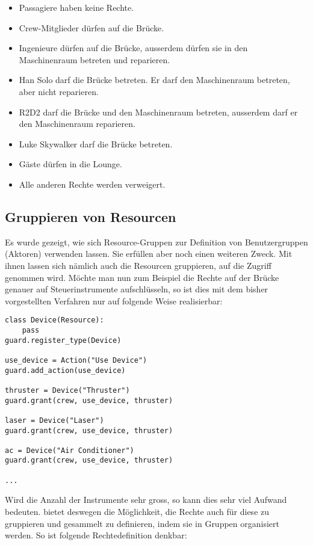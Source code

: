 \begin{itemize}
\item Passagiere haben keine Rechte.
\item Crew-Mitglieder dürfen auf die Brücke.
\item Ingenieure dürfen auf die Brücke, ausserdem dürfen sie in den 
Maschinenraum betreten und reparieren.
\item Han Solo darf die Brücke betreten. Er darf den Maschinenraum betreten, 
aber nicht reparieren.
\item R2D2 darf die Brücke und den Maschinenraum betreten, ausserdem darf er 
den Maschinenraum reparieren.
\item Luke Skywalker darf die Brücke betreten.
\item Gäste dürfen in die Lounge.
\item Alle anderen Rechte werden verweigert.
\end{itemize}


\subsection{Gruppieren von Resourcen}

Es wurde gezeigt, wie sich Resource-Gruppen zur Definition von 
Benutzergruppen (Aktoren) verwenden lassen. Sie erfüllen aber noch einen 
weiteren Zweck. Mit ihnen lassen sich nämlich auch die Resourcen gruppieren, 
auf die Zugriff genommen wird. Möchte man nun zum Beispiel die Rechte auf 
der Brücke genauer auf Steuerinstrumente aufschlüsseln, so ist dies mit dem 
bisher vorgestellten Verfahren nur auf folgende Weise realisierbar:

\begin{lstlisting}
class Device(Resource):
    pass
guard.register_type(Device)

use_device = Action("Use Device")
guard.add_action(use_device)

thruster = Device("Thruster")
guard.grant(crew, use_device, thruster)

laser = Device("Laser")
guard.grant(crew, use_device, thruster)

ac = Device("Air Conditioner")
guard.grant(crew, use_device, thruster)

...
\end{lstlisting}

Wird die Anzahl der Instrumente sehr gross, so kann dies sehr viel Aufwand 
bedeuten. \product bietet deswegen die Möglichkeit, die Rechte auch für 
diese zu gruppieren und gesammelt zu definieren, indem sie in Gruppen 
organisiert werden. So ist folgende Rechtedefinition denkbar:

